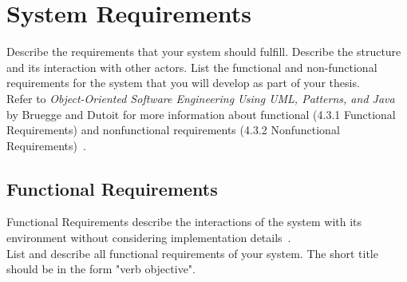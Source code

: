 \section*{System Requirements}

\begin{tcolorbox}[breakable]
	Describe the requirements that your system should fulfill. 
	Describe the structure and its interaction with other actors. 
	List the functional and non-functional requirements for the system that you will develop as part of your thesis. 
	\\
	Refer to \textit{Object-Oriented Software Engineering Using UML, Patterns, and Java} by Bruegge and Dutoit for more information about functional (4.3.1 Functional Requirements) and nonfunctional requirements (4.3.2 Nonfunctional Requirements)~\cite{bruegge2013object}.
\end{tcolorbox}

\subsection*{Functional Requirements}

\begin{tcolorbox}[breakable]
	Functional Requirements describe the interactions of the system with its environment without considering implementation details~\cite{bruegge2013object}.
	\\
	List and describe all functional requirements of your system.
	The short title should be in the form "verb objective". 
\end{tcolorbox}

